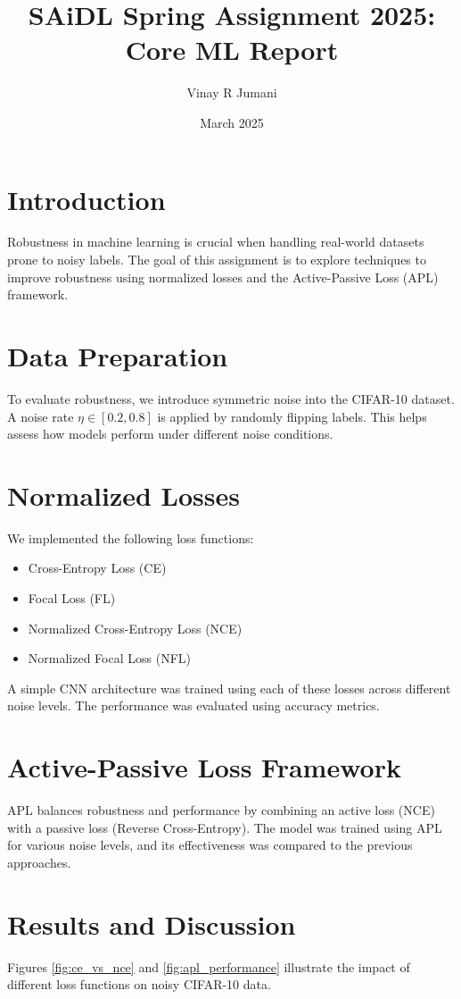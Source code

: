 \documentclass{article}
\title{SAiDL Spring Assignment 2025: Core ML Report}
\author{Vinay R Jumani}
\date{March 2025}
\begin{document}
\maketitle

\section{Introduction}
Robustness in machine learning is crucial when handling real-world datasets prone to noisy labels. The goal of this assignment is to explore techniques to improve robustness using normalized losses and the Active-Passive Loss (APL) framework.

\section{Data Preparation}
To evaluate robustness, we introduce symmetric noise into the CIFAR-10 dataset. A noise rate $\eta \in [0.2, 0.8]$ is applied by randomly flipping labels. This helps assess how models perform under different noise conditions.

\section{Normalized Losses}
We implemented the following loss functions:
\begin{itemize}
    \item Cross-Entropy Loss (CE)
    \item Focal Loss (FL)
    \item Normalized Cross-Entropy Loss (NCE)
    \item Normalized Focal Loss (NFL)
\end{itemize}

A simple CNN architecture was trained using each of these losses across different noise levels. The performance was evaluated using accuracy metrics.

\section{Active-Passive Loss Framework}
APL balances robustness and performance by combining an active loss (NCE) with a passive loss (Reverse Cross-Entropy). The model was trained using APL for various noise levels, and its effectiveness was compared to the previous approaches.

\section{Results and Discussion}
Figures \ref{fig:ce_vs_nce} and \ref{fig:apl_performance} illustrate the impact of different loss functions on noisy CIFAR-10 data.
\end{document}
